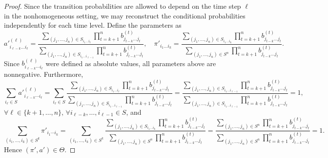 \documentclass[11pt, a4paper]{article}
\numberwithin{equation}{section}
\theoremstyle{plain}
\theoremstyle{definition}
\begin{document}
\begin{proof}
Since the transition probabilities are allowed to depend on the time step $\ell$ in the nonhomogeneous setting, we may reconstruct the conditional
probabilities independently for each time level. 
Define the parameters as
\[
a'^{(\ell)}_{i_{\ell-k}\ldots i_\ell} = \frac{\sum_{(j_1, \ldots, j_n)\in S_{i_1\ldots i_{\ell}}} 
\prod_{t = k+1}^n b^{(t)}_{j_{t-k}\ldots  j_t}}{\sum_{(j_1, \ldots, j_n)\in S_{i_1\ldots i_{\ell-1}}} 
\prod_{t = k+1}^n b^{(t)}_{j_{t-k}\ldots  j_t}}, \quad 
\pi'_{i_1\ldots i_k} = \frac{\sum_{(j_1, \ldots, j_n)\in S_{i_1\ldots i_k}}\prod_{t=k+1}^n b^{(t)}_{j_{t-k}\ldots j_t}}{\sum_{(j_1,\ldots, j_n) \in S^n} \prod_{t=k+1}^n b^{(t)}_{j_{t-k}\ldots j_t}}.
\]
Since $b^{(\ell)}_{i_{\ell-k}\cdots i_{\ell}}$ were defined as absolute values, all parameters above are nonnegative. Furthermore,
\[
\sum_{i_\ell \in S}
a'^{(\ell)}_{i_{\ell-k}\cdots i_\ell}= \sum_{i_\ell \in S} \frac{\sum_{(j_1, \ldots, j_n)\in S_{i_1\ldots i_{\ell}}} 
\prod_{t = k+1}^n b^{(t)}_{j_{t-k}\ldots  j_t}}{\sum_{(j_1, \ldots, j_n)\in S_{i_1\ldots i_{\ell-1}}} 
\prod_{t = k+1}^n b^{(t)}_{j_{t-k}\ldots  j_t}} =  \frac{\sum_{(j_1, \ldots, j_n)\in S_{i_1\ldots i_{\ell-1}}} 
\prod_{t = k+1}^n b^{(t)}_{j_{t-k}\ldots  j_t}}{\sum_{(j_1, \ldots, j_n)\in S_{i_1\ldots i_{\ell-1}}} 
\prod_{t = k+1}^n b^{(t)}_{j_{t-k}\ldots  j_t}} = 1,
\]
$\forall \ell \in \{k+1,\ldots,n\}, \, \forall i_{\ell-k},\ldots,i_{\ell-1} \in S$,
and
\[
\sum_{(i_1,\ldots,i_k) \in S^k}\pi'_{i_1\cdots i_k} =\sum_{(i_1,\ldots,i_k) \in S^k} \frac{\sum_{(j_1, \ldots, j_n)\in S_{i_1\ldots i_k}}\prod_{t=k+1}^n b^{(t)}_{j_{t-k}\ldots j_t}}{\sum_{(j_1,\ldots, j_n) \in S^n} \prod_{t=k+1}^n b^{(t)}_{j_{t-k}\ldots j_t}}= \frac{\sum_{(j_1,\ldots, j_n) \in S^n} \prod_{t=k+1}^n b^{(t)}_{j_{t-k}\ldots j_t}}{\sum_{(j_1,\ldots, j_n) \in S^n} \prod_{t=k+1}^n b^{(t)}_{j_{t-k}\ldots j_t}}=1.
\]
Hence $(\pi',a')\in\Theta$.
 


\end{proof}
\end{document}
